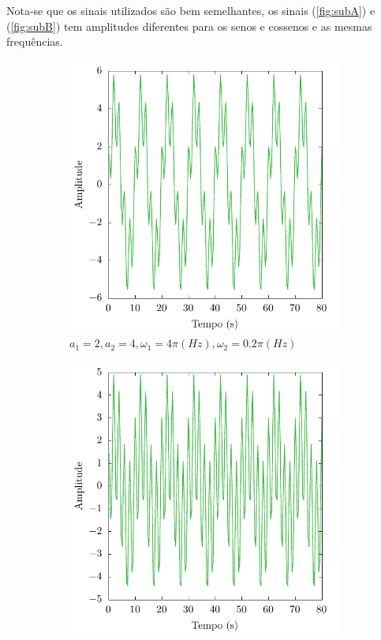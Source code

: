 \documentclass[a4paper, 11pt]{article}
\begin{document}
Nota-se que os sinais utilizados são bem semelhantes, os sinais (\ref{fig:subA}) e (\ref{fig:subB})
tem amplitudes diferentes para os senos e cossenos e as mesmas frequências. 


\begin{figure}[h!]
  \centering
    \begin{subfigure}{0.45\textwidth}
        \centering
        \includegraphics[width=\textwidth]{signal-C}
        \caption{\(a_1 = 2, a_2 = 4, \omega_1 = 4\pi(Hz), \omega_2 = 0.2\pi (Hz)\)}
        \label{fig:subC}
    \end{subfigure} 
    \begin{subfigure}{0.45\textwidth}
        \centering
        \includegraphics[width=\textwidth]{signal-D}

\end{subfigure}
\end{figure}
\end{document}
